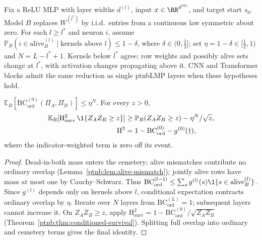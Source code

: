 Fix a ReLU MLP with layer widths $d^{(l)}$, input $x\in\RR^{d^{(0)}}$, and target start $s_0$.
Model $B$ replaces $W^{(l^*)}$ by i.i.d.\ entries from a continuous law symmetric about zero.
For each $l\ge l^*$ and neuron $i$, assume
$\mathbb P_B(i\in\mathrm{alive}^{(l)}_B\mid\text{kernels above }l)\le1-\delta$,
where $\delta\in(0,\tfrac12]$; set $\eta=1-\delta\in[\tfrac12,1)$ and $N=L-l^*+1$.
Kernels below $l^*$ agree; row weights and possibly alive sets change at $l^*$,
with activation changes propagating above it. CNN and Transformer blocks admit the same
reduction as single \ac{ptnbLMP} layers when these hypotheses hold.

\begin{theoremenv}\label{ptnb:thm:rand-adf}\label{thm:rand_stopping}
$\mathbb E_B[\mathrm{BC}^{(0)}_{\mathrm{ord}}(\Pi_A,\Pi_B)]\le\eta^N$.
For every $z>0$,
\[
\begin{aligned}
\mathbb E_B[\mathrm H^2_{\mathrm{surv}}\,\1\{Z_AZ_B\ge z\}]
&\ge\mathbb P_B(Z_AZ_B\ge z)-\eta^N/\sqrt z,\\
\mathrm H^2&=1-\mathrm{BC}^{(0)}_{\mathrm{ord}}-g^{(0)}(\dagger),
\end{aligned}
\]
where the indicator-weighted term is zero off its event.
\end{theoremenv}
\begin{proof}
Dead-in-both mass enters the cemetery; alive mismatches contribute no ordinary overlap
(Lemma~\ref{ptnb:lem:alive-mismatch}); jointly alive rows have mass at most one by Cauchy--Schwarz. Thus
$\mathrm{BC}^{(l-1)}_{\mathrm{ord}}\le\sum_s g^{(l)}(s)\1\{s\in\mathrm{alive}^{(l)}_B\}$.
Since $g^{(l)}$ depends only on kernels above $l$, conditional expectation contracts ordinary
overlap by $\eta$. Iterate over $N$ layers from $\mathrm{BC}^{(L)}_{\mathrm{ord}}=1$;
subsequent layers cannot increase it. On $Z_AZ_B\ge z$, apply
$\mathrm H^2_{\mathrm{surv}}=1-\mathrm{BC}^{(0)}_{\mathrm{ord}}/\sqrt{Z_AZ_B}$
(Theorem~\ref{ptnb:thm:conditioned-survival}). Splitting full overlap into ordinary and cemetery terms gives the final identity.
\end{proof}

